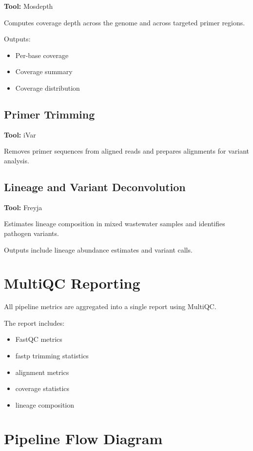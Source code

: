 \documentclass[11pt]{article}
\begin{document}
\textbf{Tool:} Mosdepth

Computes coverage depth across the genome and across targeted primer regions.

Outputs:

\begin{itemize}
\item Per-base coverage
\item Coverage summary
\item Coverage distribution
\end{itemize}

\subsection{Primer Trimming}

\textbf{Tool:} iVar

Removes primer sequences from aligned reads and prepares alignments for variant analysis.

\subsection{Lineage and Variant Deconvolution}

\textbf{Tool:} Freyja

Estimates lineage composition in mixed wastewater samples and identifies pathogen variants.

Outputs include lineage abundance estimates and variant calls.

\section{MultiQC Reporting}

All pipeline metrics are aggregated into a single report using MultiQC.

The report includes:

\begin{itemize}
\item FastQC metrics
\item fastp trimming statistics
\item alignment metrics
\item coverage statistics
\item lineage composition
\end{itemize}

\section{Pipeline Flow Diagram}
\end{document}
